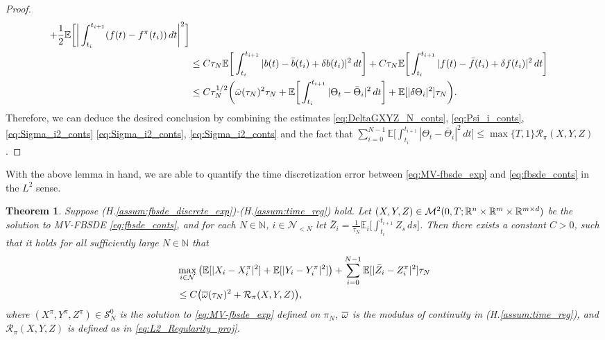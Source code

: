 \documentclass[11pt]{article}
\numberwithin{equation}{section}
\newtheorem{Theorem}{Theorem}[section]
\theoremstyle{definition}
\theoremstyle{remark}
\def\ol{\overline} \def\cl{\centerline}   \def\ul{\underline}
\def\l{\label}  \def\f{\frac}  \def\fa{\forall}
\def\cM{\mathcal{M}}
\def\cN{\mathcal{N}}
\def\cR{\mathcal{R}}
\def\cS{\mathcal{S}}
\def\sE{{\mathbb{E}}}
\def\sN{{\mathbb{N}}}
\def\sR{{\mathbb R}}
\begin{document}
\begin{proof}
\begin{align}
\begin{split}
+\frac{1}{2}
\sE\bigg[\bigg|\int_{t_i}^{t_{i+1}}(f(t)-{f}^\pi(t_{i}))\,dt\bigg|^2
\bigg]
\\
&\le 
C\tau_N\sE\bigg[
\int_{t_i}^{t_{i+1}}|b(t)-\bar{b}(t_i)+\delta {b}(t_i)|^2\,d t\bigg]
+C\tau_N
\sE\bigg[\int_{t_i}^{t_{i+1}}|f(t)-\bar{f}(t_i)+\delta {f}(t_i)|^2\,dt
\bigg]
\\
&\le 
C\tau_N^{1/2}
\bigg(
\bar{\om}(\tau_N)^2\tau_N+
\sE
\bigg[
 \int_{t_i}^{t_{i+1}}
|\Theta_t-\bar{\Theta}_i|^2
 \,dt
 \bigg]
+\sE[|\delta \Theta_i|^2]\tau_N
\bigg).
\end{split}
\end{align}
Therefore, 
we can deduce the desired conclusion by  
combining the estimates \eqref{eq:DeltaGXYZ_N_conts}, \eqref{eq:Psi_i_conts}, \eqref{eq:Sigma_i2_conts}
\eqref{eq:Sigma_i2_conts}, \eqref{eq:Sigma_i2_conts} and the fact that 
$\sum_{i=0}^{N-1}\sE\big[
 \int_{t_i}^{t_{i+1}}
|\Theta_t-\bar{\Theta}_i|^2
 \,dt \big]\le \max\{T,1\}\cR_\pi(X,Y,Z)$.
\end{proof}











With the above lemma in hand,
 we  are able to quantify the time discretization error between
 \eqref{eq:MV-fbsde_exp} and \eqref{eq:fbsde_conts} in the $L^2$ sense.


\begin{Theorem}\l{thm:time_error}
Suppose (H.\ref{assum:fbsde_discrete_exp})-(H.\ref{assum:time_reg}) hold.
Let
$(X,Y, Z)\in \cM^2(0,T;\sR^n\t \sR^m\t \sR^{m\t d })$ be the solution to MV-FBSDE \eqref{eq:fbsde_conts},
and 
for each $N\in \sN$, $i\in \cN_{<N}$
let $\bar{Z}_i=\frac{1}{\tau_N}\sE_i\big[\int_{t_i}^{t_{i+1}} Z_s\, ds\big]$.
Then 
there exists a constant $C>0$, such that 
it holds for  all sufficiently large $N\in \sN$
that
\begin{align*}
&\max_{i\in \cN}\left(
\sE[|
X_i
-{X}^\pi_{i}|^2]
+
\sE[|
{Y}_i
-{Y}^\pi_{i}|^2]
\right)
+
\sum_{i=0}^{N-1}
\sE[
|\bar{Z}_{i}
-{Z}^\pi_{i}|^2
]\tau_N
\\
&\le 
C\big(\ol{\om}(\tau_N)^2
+
\cR_\pi(X,Y,Z)
\big),
\end{align*}
where $(X^\pi,Y^\pi, Z^\pi)\in \cS^0_N$
is the solution to  \eqref{eq:MV-fbsde_exp} defined on $\pi_N$,
$\ol{\om}$ is the modulus of continuity in (H.\ref{assum:time_reg}),
and $\cR_\pi(X,Y,Z)$ is defined as  in \eqref{eq:L2_Regularity_proj}.

\end{Theorem}
\end{document}
